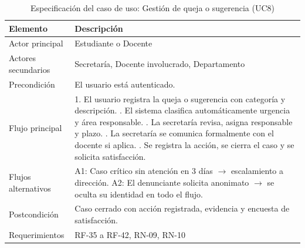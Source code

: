 \begin{table}[H]
\centering
\caption{Especificación del caso de uso: Gestión de queja o sugerencia (UC8)}
\label{tab:uc8}
\small
\begin{tabularx}{\textwidth}{@{}l X@{}}
\toprule
\rowcolor{naranjaClaro}
\textbf{Elemento} & \textbf{Descripción} \\
\midrule
Actor principal & Estudiante o Docente \\
Actores secundarios & Secretaría, Docente involucrado, Departamento \\
Precondición & El usuario está autenticado. \\
Flujo principal &
  1. El usuario registra la queja o sugerencia con categoría y descripción. \newline
  2. El sistema clasifica automáticamente urgencia y área responsable. \newline
  3. La secretaría revisa, asigna responsable y plazo. \newline
  4. La secretaría se comunica formalmente con el docente si aplica. \newline
  5. Se registra la acción, se cierra el caso y se solicita satisfacción. \\
Flujos alternativos &
  A1: Caso crítico sin atención en 3 días $\to$ escalamiento a dirección. \newline
  A2: El denunciante solicita anonimato $\to$ se oculta su identidad en todo el flujo. \\
Postcondición & Caso cerrado con acción registrada, evidencia y encuesta de satisfacción. \\
Requerimientos & RF-35 a RF-42, RN-09, RN-10 \\
\bottomrule
\end{tabularx}
\end{table}

